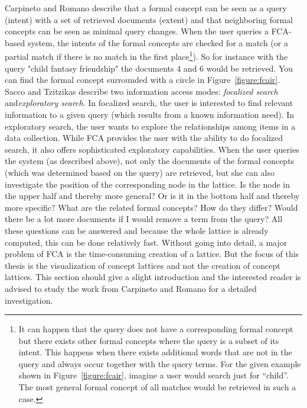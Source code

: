 \documentclass[11pt]{report}
\begin{document}
Carpineto and Romano \cite{Carpineto2005} describe that a formal concept can be seen as a query (intent) with a set of retrieved documents (extent) and that neighboring formal concepts can be seen as minimal query changes. When the user queries a FCA-based system, the intents of the formal concepts are checked for a match (or a partial match if there is no match in the first place\footnote{It can happen that the query does not have a corresponding formal concept but there exists other formal concepts where the query is a subset of its intent. This happens when there exists additional words that are not in the query and always occur together with the query terms. For the given example shown in Figure~\ref{figure:fcair}, imagine a user would search just for ``child''. The most general formal concept of all matches would be retrieved in such a case.}). So for instance with the query "child fantasy friendship" the documents 4 and 6 would be retrieved. You can find the formal concept surrounded with a circle in Figure~\ref{figure:fcair}.\\

Sacco and Tzitzikas \cite{Sacco2009} describe two information access modes: \textit{focalized search} and\textit{exploratory search}. In focalized search, the user is interested to find relevant information to a given query (which results from a known information need). In exploratory search, the user wants to explore the relationships among items in a data collection. While FCA provides the user with the ability to do focalized search, it also offers sophisticated exploratory capabilities. When the user queries the system (as described above), not only the documents of the formal concepts (which was determined based on the query) are retrieved, but she can also investigate the position of the corresponding node in the lattice. Is the node in the upper half and thereby more general? Or is it in the bottom half and thereby more specific? What are the related formal concepts? How do they differ? Would there be a lot more documents if I would remove a term from the query? All these questions can be answered and because the whole lattice is already computed, this can be done relatively fast. Without going into detail, a major problem of FCA is the time-consuming creation of a lattice. But the focus of this thesis is the visualization of concept lattices and not the creation of concept lattices. This section should give a slight introduction and the interested reader is advised to study the work from Carpineto and Romano \cite{carpineto2004concept} for a detailed investigation. \\
\end{document}
